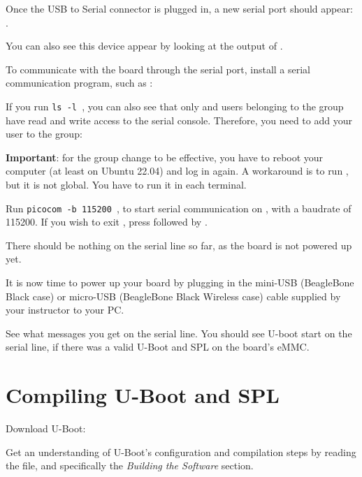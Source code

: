 Once the USB to Serial connector is plugged in, a new serial port
should appear: .

You can also see this device appear by looking at the output of
.

To communicate with the board through the serial port, install a
serial communication program, such as :


If you run {\tt ls -l \hosttty}, you can also see that only
 and users belonging to the  group have
read and write access to the serial console. Therefore, you need
to add your user to the  group:


{\bf Important}: for the group change to be effective, you have to
reboot your computer (at least on Ubuntu 22.04) and log in again.
A workaround is to run , but it is not global.
You have to run it in each terminal.

Run {\tt picocom -b 115200 \hosttty}, to start serial
communication on {\tt \hosttty}, with a baudrate of 115200.
If you wish to exit , press \code{[Ctrl][a]} followed by
\code{[Ctrl][x]}.

There should be nothing on the serial line so far, as the board is not
powered up yet.

It is now time to power up your board by plugging in the mini-USB
(BeagleBone Black case) or micro-USB (BeagleBone Black Wireless case)
cable supplied by your instructor to your PC.

See what messages you get on the serial line. You should see U-boot
start on the serial line, if there was a valid U-Boot and SPL on the board's eMMC.

\section{Compiling U-Boot and SPL}

Download U-Boot:


Get an understanding of U-Boot's configuration and compilation steps
by reading the  file, and specifically the {\em Building
the Software} section.


